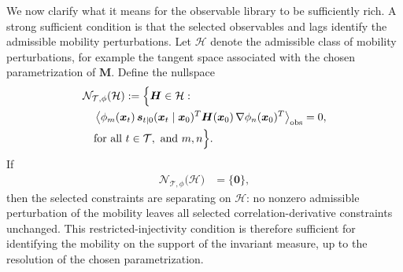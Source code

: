 \documentclass[11pt,twoside,fleqn]{article}
\begin{document}
We now clarify what it means for the observable library to be sufficiently rich. A strong sufficient
condition is that the selected observables and lags identify the admissible
mobility perturbations. Let $\mathcal{H}$ denote the admissible class of
mobility perturbations, for example the tangent space associated with the
chosen parametrization of $\bm{M}$. Define the nullspace
\begin{equation}
\begin{aligned}
    &\mathcal{N}_{\mathcal{T},\phi}(\mathcal{H})
    :=
    \Bigl\{
        \bm{H}\in\mathcal{H}: \\
        &\quad\left\langle
            \phi_m(\bm{x}_t)\,
            \bm{s}_{t|0}(\bm{x}_t\mid\bm{x}_0)^T
            \bm{H}(\bm{x}_0)\,
            \nabla\phi_n(\bm{x}_0)^T
        \right\rangle_{\mathrm{obs}}
        =0, \\
        &\quad\text{for all } t\in\mathcal{T}, \text{ and } m,n
    \Bigr\}.
\end{aligned}
    \label{eq:mobility_operator_nullspace}
\end{equation}
If
\begin{equation}
\begin{aligned}
    \mathcal{N}_{\mathcal{T},\phi}
    \bigl(\mathcal{H}\bigr)
    &=
    \{\bm{0}\},
\end{aligned}
    \label{eq:restricted_injectivity_condition_method}
\end{equation}
then the selected constraints are separating on $\mathcal{H}$: no nonzero
admissible perturbation of the mobility leaves all selected
correlation-derivative constraints unchanged. This restricted-injectivity
condition is therefore sufficient for identifying the mobility on the support
of the invariant measure, up to the resolution of the chosen parametrization.
\end{document}
